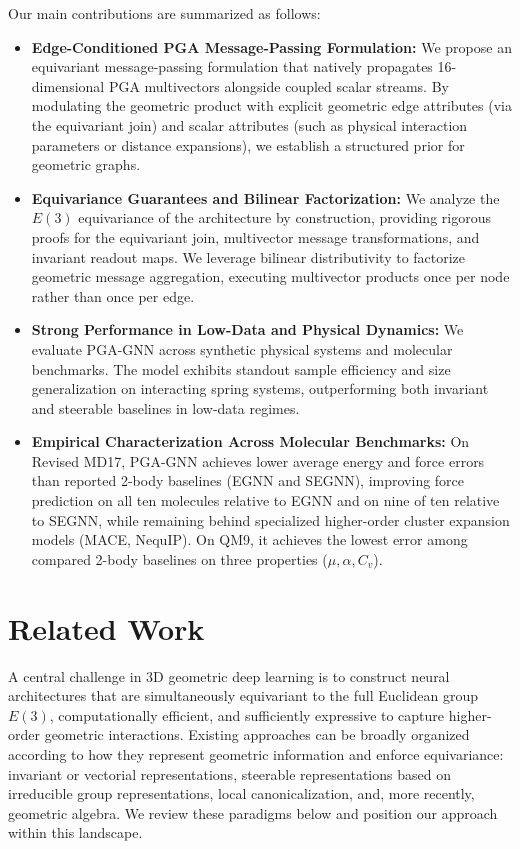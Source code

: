 \documentclass[10pt]{article}
\begin{document}
Our main contributions are summarized as follows:
\begin{itemize}
    \item \textbf{Edge-Conditioned PGA Message-Passing Formulation:} We propose an equivariant message-passing formulation that natively propagates 16-dimensional PGA multivectors alongside coupled scalar streams. By modulating the geometric product with explicit geometric edge attributes (via the equivariant join) and scalar attributes (such as physical interaction parameters or distance expansions), we establish a structured prior for geometric graphs.
    \item \textbf{Equivariance Guarantees and Bilinear Factorization:} We analyze the $E(3)$ equivariance of the architecture by construction, providing rigorous proofs for the equivariant join, multivector message transformations, and invariant readout maps. We leverage bilinear distributivity to factorize geometric message aggregation, executing multivector products once per node rather than once per edge.
    \item \textbf{Strong Performance in Low-Data and Physical Dynamics:} We evaluate PGA-GNN across synthetic physical systems and molecular benchmarks. The model exhibits standout sample efficiency and size generalization on interacting spring systems, outperforming both invariant and steerable baselines in low-data regimes.
    \item \textbf{Empirical Characterization Across Molecular Benchmarks:} On Revised MD17, PGA-GNN achieves lower average energy and force errors than reported 2-body baselines (EGNN and SEGNN), improving force prediction on all ten molecules relative to EGNN and on nine of ten relative to SEGNN, while remaining behind specialized higher-order cluster expansion models (MACE, NequIP). On QM9, it achieves the lowest error among compared 2-body baselines on three properties ($\mu, \alpha, C_v$).
\end{itemize}


\section{Related Work}
\label{sec:related_work}

A central challenge in 3D geometric deep learning is to construct neural architectures that are simultaneously equivariant to the full Euclidean group $E(3)$, computationally efficient, and sufficiently expressive to capture higher-order geometric interactions. Existing approaches can be broadly organized according to how they represent geometric information and enforce equivariance: invariant or vectorial representations, steerable representations based on irreducible group representations, local canonicalization, and, more recently, geometric algebra. We review these paradigms below and position our approach within this landscape.
\end{document}
